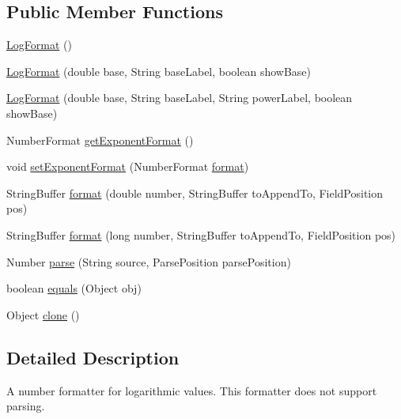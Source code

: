 \subsection*{Public Member Functions}
\begin{DoxyCompactItemize}
\item 
\mbox{\hyperlink{classorg_1_1jfree_1_1chart_1_1util_1_1_log_format_a9d2b4c62aaac1ff57752e928d1d04277}{Log\+Format}} ()
\item 
\mbox{\hyperlink{classorg_1_1jfree_1_1chart_1_1util_1_1_log_format_a1254ab641b3dd721240a2f5f7379f1f8}{Log\+Format}} (double base, String base\+Label, boolean show\+Base)
\item 
\mbox{\hyperlink{classorg_1_1jfree_1_1chart_1_1util_1_1_log_format_a0d20022a0963f48080a017f138269cb9}{Log\+Format}} (double base, String base\+Label, String power\+Label, boolean show\+Base)
\item 
Number\+Format \mbox{\hyperlink{classorg_1_1jfree_1_1chart_1_1util_1_1_log_format_a265767e3d6562cc5175740bae75957f8}{get\+Exponent\+Format}} ()
\item 
void \mbox{\hyperlink{classorg_1_1jfree_1_1chart_1_1util_1_1_log_format_af445424e9e6a4aed692aa9e61ef69230}{set\+Exponent\+Format}} (Number\+Format \mbox{\hyperlink{classorg_1_1jfree_1_1chart_1_1util_1_1_log_format_ad336f9867b22d697c53fefd616dc272e}{format}})
\item 
String\+Buffer \mbox{\hyperlink{classorg_1_1jfree_1_1chart_1_1util_1_1_log_format_ad336f9867b22d697c53fefd616dc272e}{format}} (double number, String\+Buffer to\+Append\+To, Field\+Position pos)
\item 
String\+Buffer \mbox{\hyperlink{classorg_1_1jfree_1_1chart_1_1util_1_1_log_format_a0f336cd06c1701c7350d84482970b0a0}{format}} (long number, String\+Buffer to\+Append\+To, Field\+Position pos)
\item 
Number \mbox{\hyperlink{classorg_1_1jfree_1_1chart_1_1util_1_1_log_format_a4beb30752c145fc151c8c5bb8fb8d0b5}{parse}} (String source, Parse\+Position parse\+Position)
\item 
boolean \mbox{\hyperlink{classorg_1_1jfree_1_1chart_1_1util_1_1_log_format_a01f11f4304c98f352fd7f8094f54fa1f}{equals}} (Object obj)
\item 
Object \mbox{\hyperlink{classorg_1_1jfree_1_1chart_1_1util_1_1_log_format_adc5aa54d2db9bb52a1d8ff21a3331b36}{clone}} ()
\end{DoxyCompactItemize}


\subsection{Detailed Description}
A number formatter for logarithmic values. This formatter does not support parsing.

